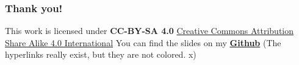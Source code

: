 \documentclass{beamer}
\begin{document}

\begin{frame}
\frametitle{Thank you!}
\begin{center}
    This work is licensed under \textbf{CC-BY-SA 4.0}
    \newline
    \href{https://creativecommons.org/licenses/by-sa/4.0/}{Creative Commons Attribution Share Alike 4.0 International}
    \newline\newline
    You can find the slides on my \href{https://github.com/sakamitz/latex-presentations/tree/master/laziness-of-ghc}{\textbf{Github}}
    \newline\newline
    (The hyperlinks really exist, but they are not colored. x)
\end{center}
\end{frame}
\end{document}

